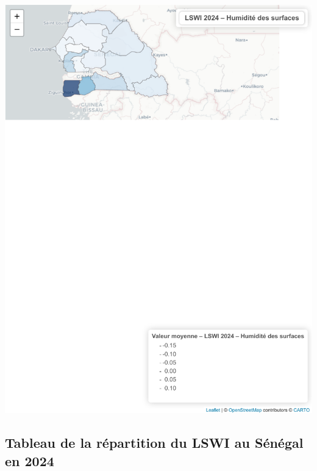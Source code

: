 \documentclass[
]{book}
\begin{document}
\includegraphics{Atlas-Spectral-Sahel_files/figure-latex/eau-lswi-1.pdf}

\subsection{Tableau de la répartition du LSWI au Sénégal en 2024}\label{tableau-de-la-ruxe9partition-du-lswi-au-suxe9nuxe9gal-en-2024}
\end{document}
